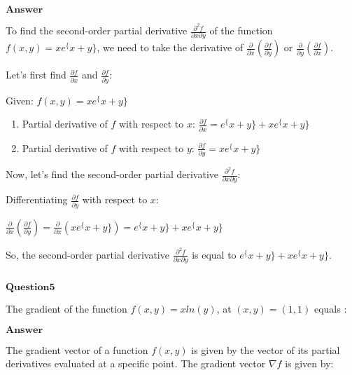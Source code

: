 \documentclass[11pt]{article}
\makeatletter
\newcommand{\boxspacing}{\kern\kvtcb@left@rule\kern\kvtcb@boxsep}
\newcommand{\prompt}[4]{
        {\ttfamily\llap{{\color{#2}[#3]:\hspace{3pt}#4}}\vspace{-\baselineskip}}
    }
\makeatother
\begin{document}
$\textbf{Answer}$

    To find the second-order partial derivative $
\frac{\partial^2 f}{\partial x \partial y} $ of the function $ f(x, y)
= xe^\{x+y\} $, we need to take the derivative of $
\frac{\partial}{\partial x} \left( \frac{\partial f}{\partial y} \right)
$ or $ \frac{\partial}{\partial y} \left(
\frac{\partial f}{\partial x} \right) $.

Let's first find $ \frac{\partial f}{\partial x} $ and $
\frac{\partial f}{\partial y} $:

Given: $ f(x, y) = xe^\{x+y\} $

\begin{enumerate}
\def\labelenumi{\arabic{enumi}.}
\item
  Partial derivative of $ f $ with respect to $ x $: $
  \frac{\partial f}{\partial x} = e^\{x+y\} + xe^\{x+y\} $
\item
  Partial derivative of $ f $ with respect to $ y $: $
  \frac{\partial f}{\partial y} = xe^\{x+y\} $
\end{enumerate}

Now, let's find the second-order partial derivative $
\frac{\partial^2 f}{\partial x \partial y} $:

Differentiating $ \frac{\partial f}{\partial y} $ with respect to $ x
$:

$ \frac{\partial}{\partial x} \left( \frac{\partial f}{\partial y}
\right) = \frac{\partial}{\partial x} (xe^\{x+y\}) = e^\{x+y\} +
xe^\{x+y\} $

So, the second-order partial derivative $
\frac{\partial^2 f}{\partial x \partial y} $ is equal to $
e^\{x+y\} + xe^\{x+y\} $.

    \begin{tcolorbox}[breakable, size=fbox, boxrule=1pt, pad at break*=1mm,colback=cellbackground, colframe=cellborder]
\prompt{In}{incolor}{ }{\boxspacing}
\begin{Verbatim}[commandchars=\\\{\}]

\end{Verbatim}
\end{tcolorbox}

    $\textbf{Question5}$

The gradient of the function $f(x,y)=xln(y)$, at $(x,y)=(1,1)$
equals :

$\textbf{Answer}$

    The gradient vector of a function $ f(x, y) $ is given by the vector
of its partial derivatives evaluated at a specific point. The gradient
vector $ \nabla f $ is given by:
\end{document}
